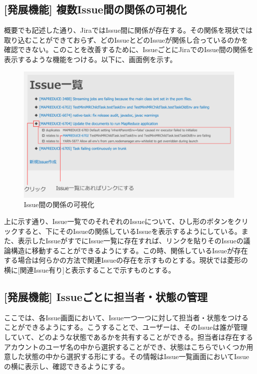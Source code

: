 \documentclass[12pt, oneside]{jreport}
\begin{document}
		\subsection{[発展機能] 複数Issue間の関係の可視化}
		概要でも記述した通り、JiraではIssue間に関係が存在する。その関係を現状では取り込むことができておらず、どのIssueとどのIssueが関係し合っているのかを確認できない。このことを改善するために、IssueごとにJiraでのIssue間の関係を表示するような機能をつける。以下に、画面例を示す。
		
		\begin{figure}[H]
		\centering
		\includegraphics[width=17cm,bb=300 300 -200 27]{RelatesVisualize.png}
		\caption{Issue間の関係の可視化}
		\end{figure}
		
		上に示す通り、Issue一覧でのそれぞれのIssueについて、ひし形のボタンをクリックすると、下にそのIssueの関係しているIssueを表示するようにしている。また、表示したIssueがすでにIssue一覧に存在すれば、リンクを貼りそのIssueの議論構造に移動することができるようにする。この時、関係しているIssueが存在する場合は何らかの方法で関連Issueの存在を示すものとする。現状では菱形の横に[関連Issue有り]と表示することで示すものとする。

		\subsection{[発展機能] Issueごとに担当者・状態の管理}
		ここでは、各Issue画面において、Issue一つ一つに対して担当者・状態をつけることができるようにする。こうすることで、ユーザーは、そのIssueは誰が管理していて、どのような状態であるかを共有することができる。担当者は存在するアカウントのユーザ名の中から選択することができ、状態はこちらでいくつか用意した状態の中から選択する形にする。その情報はIssue一覧画面においてIssueの横に表示し、確認できるようにする。
		
\end{document}
